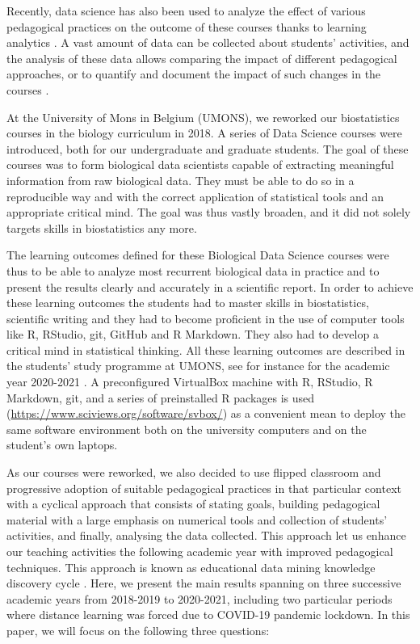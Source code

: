 \documentclass{aims}
\theoremstyle{definition}
\begin{document}
Recently, data science has also been used to analyze the effect of
various pedagogical practices on the outcome of these courses thanks to
learning analytics \cite{Estrellado2020}. A vast amount of data can be
collected about students' activities, and the analysis of these data
allows comparing the impact of different pedagogical approaches, or to
quantify and document the impact of such changes in the courses
\cite{Romero2020}.

At the University of Mons in Belgium (UMONS), we reworked our
biostatistics courses in the biology curriculum in 2018. A series of
Data Science courses were introduced, both for our undergraduate and
graduate students. The goal of these courses was to form biological data
scientists capable of extracting meaningful information from raw
biological data. They must be able to do so in a reproducible way and
with the correct application of statistical tools and an appropriate
critical mind. The goal was thus vastly broaden, and it did not solely
targets skills in biostatistics any more.

The learning outcomes defined for these Biological Data Science courses
were thus to be able to analyze most recurrent biological data in
practice and to present the results clearly and accurately in a
scientific report. In order to achieve these learning outcomes the
students had to master skills in biostatistics, scientific writing and
they had to become proficient in the use of computer tools like R,
RStudio, git, GitHub and R Markdown. They also had to develop a critical
mind in statistical thinking. All these learning outcomes are described
in the students' study programme at UMONS, see for instance for the
academic year 2020-2021 \cite{ds1bio2021, ds2bio2021, ds3bio2021}. A
preconfigured VirtualBox machine with R, RStudio, R Markdown, git, and a
series of preinstalled R packages is used
(\url{https://www.sciviews.org/software/svbox/}) as a convenient mean to
deploy the same software environment both on the university computers
and on the student's own laptops.

As our courses were reworked, we also decided to use flipped classroom
and progressive adoption of suitable pedagogical practices in that
particular context with a cyclical approach that consists of stating
goals, building pedagogical material with a large emphasis on numerical
tools and collection of students' activities, and finally, analysing the
data collected. This approach let us enhance our teaching activities the
following academic year with improved pedagogical techniques. This
approach is known as educational data mining knowledge discovery cycle
\cite{Romero2020}. Here, we present the main results spanning on three
successive academic years from 2018-2019 to 2020-2021, including two
particular periods where distance learning was forced due to COVID-19
pandemic lockdown. In this paper, we will focus on the following three
questions:
\end{document}
